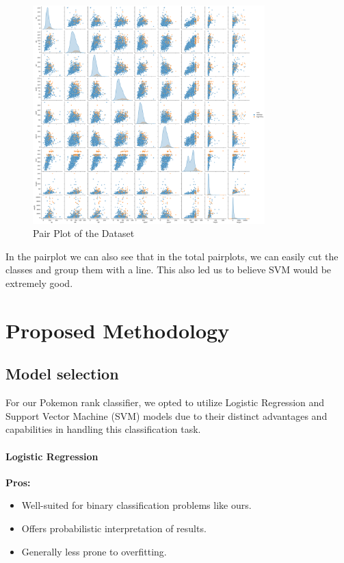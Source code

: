 \documentclass[conference]{IEEEtran}
\begin{document}
    \begin{figure}[H]
        \centering
        \includegraphics[width=0.8\textwidth]{pairplot.png} %
        \caption{Pair Plot of the Dataset}
        \label{fig:dataset-pairplot}
    \end{figure}
In the pairplot we can also see that in the total pairplots, we can easily cut the classes and group them with a line. This also led us to believe SVM would be extremely good. 

	\chapter{Proposed Methodology}
\section{Model selection}
For our Pokemon rank classifier, we opted to utilize Logistic Regression and Support Vector Machine (SVM) models due to their distinct advantages and capabilities in handling this classification task.

\subsubsection{Logistic Regression}
\textbf{Pros:}
\begin{itemize}
    \item Well-suited for binary classification problems like ours.
    \item Offers probabilistic interpretation of results.
    \item Generally less prone to overfitting.
\end{itemize}
\end{document}
